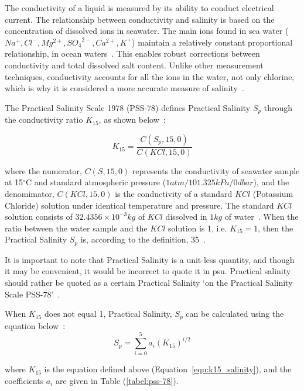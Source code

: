 The conductivity of a liquid is measured by its ability to conduct electrical current.
The relationship between conductivity and salinity is based on the concentration of dissolved ions in seawater.
The main ions found in sea water ($Na^+, Cl^-, Mg^{2+}, {SO_4}^{2-}, Ca^{2+}, K^+$) maintain a relatively constant proportional relationship, in ocean waters~\cite{chemical_ocean}.
This enables robust corrections between conductivity and total dissolved salt content.
Unlike other measurement techniques, conductivity accounts for all the ions in the water, not only chlorine, which is why it is considered a more accurate measure of salinity~\cite{salinity_def_calc}.

The Practical Salinity Scale 1978 (PSS-78) defines Practical Salinity $S_p$ through the conductivity ratio $K_{15}$, as shown below~\cite{teos-10}:

\begin{equation}\label{eqn:k15_salinity}
    K_{15} = \frac{C(S_p, 15, 0)}{C(KCl, 15, 0)}
\end{equation}

where the numerator, $C(S, 15, 0)$ represents the conductivity of seawater sample at 15$^\circ$C and standard atmospheric pressure ($1 atm/101.325 kPa/0dbar$), and the denomimator, $C(KCl, 15, 0)$ is the conductivity of a standard $KCl$ (Potassium Chloride) solution under identical temperature and pressure.
The standard $KCl$ solution consists of $32.4356 \times 10^{-3}kg$ of $KCl$ dissolved in $1kg$ of water~\cite{lewis_pss78}.
When the ratio between the water sample and the $KCl$ solution is 1, i.e. $K_{15} = 1$, then the Practical Salinity $S_p$ is, according to the definition, 35~\cite{teos-10}.

It is important to note that Practical Salinity is a unit-less quantity, and though it may be convenient, it would be incorrect to quote it in \gls{psu}. 
Practical salinity should rather be quoted as a certain Practical Salinity `on the Practical Salinity Scale PSS-78'~\cite{teos-10}. 

When $K_{15}$ does not equal 1, Practical Salinity, $S_p$ can be calculated using the equation below~\cite{teos-10}: 
\begin{equation}\label{eqn:salinity_short}
    S_p = \sum_{i=0}^{5}a_i{(K_{15})}^{i/2} 
\end{equation}

where $K_{15}$ is the equation defined above (Equation~\ref{eqn:k15_salinity}), and the coefficients $a_i$ are given in Table (\ref{tabel:pss-78}).



